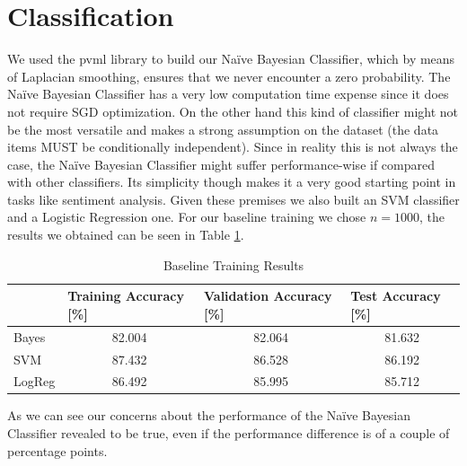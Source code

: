 \documentclass[10pt,a4paper]{report}
\begin{document}
\section{Classification}
We used the pvml library to build our Na\"{i}ve Bayesian Classifier, which by means of Laplacian smoothing, ensures that we never encounter a zero probability. The Na\"{i}ve Bayesian Classifier has a very low computation time expense since it does not require SGD optimization. On the other hand this kind of classifier might not be the most versatile and makes a strong assumption on the dataset (the data items MUST be conditionally independent). Since in reality this is not always the case, the Na\"{i}ve Bayesian Classifier might suffer performance-wise if compared with other classifiers. Its simplicity though makes it a very good starting point in tasks like sentiment analysis. Given these premises we also built an SVM classifier and a Logistic Regression one. For our baseline training we chose $n=1000$, the results we obtained can be seen in Table \ref{tab:baseline_training}.
\begin{table}[!ht]
\centering
\begin{tabular}{|l|c|c|c|}
\hline
 & \multicolumn{1}{l|}{Training Accuracy {[}\%{]}} & \multicolumn{1}{l|}{Validation Accuracy {[}\%{]}} & \multicolumn{1}{l|}{Test Accuracy {[}\%{]}} \\ \hline
Bayes  & 82.004 & 82.064 & 81.632 \\ \hline
SVM    & 87.432 & 86.528 & 86.192 \\ \hline
LogReg & 86.492 & 85.995 & 85.712 \\ \hline
\end{tabular}
\caption{Baseline Training Results}
\label{tab:baseline_training}
\end{table}
As we can see our concerns about the performance of the Na\"{i}ve Bayesian Classifier revealed to be true, even if the performance difference is of a couple of percentage points.
\end{document}
